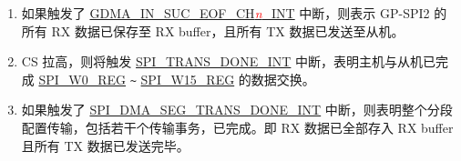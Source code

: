 \documentclass[main\_\_CN.tex]{subfiles}
\begin{document}
\begin{tiplisting}
\vspace{-2em}
\begin{enumerate}

\item 如果触发了 \hyperref[int:GDMAINSUCEOFINT]{GDMA\_IN\_SUC\_EOF\_CH\textcolor{red}{\it{n}}\_INT}  中断，则表示 GP-SPI2 的所有 RX 数据已保存至 RX buffer，且所有 TX 数据已发送至从机\label{other:spi-item-gp-spi2-master-interrupts-note-1}。

\item CS 拉高，则将触发 \hyperref[int:SPITRANSDONEINT]{SPI\_TRANS\_DONE\_INT} 中断，表明主机与从机已完成 \hyperref[regdesc:SPIW0REG]{SPI\_W0\_REG} \verb+~+ \hyperref[regdesc:SPIW15REG]{SPI\_W15\_REG} 的数据交换\label{other:spi-item-gp-spi2-master-interrupts-note-2}。

\item 如果触发了 \hyperref[int:SPIDMASEGTRANSDONEINT]{SPI\_DMA\_SEG\_TRANS\_DONE\_INT} 中断，则表明整个分段配置传输，包括若干个传输事务，已完成。即 RX 数据已全部存入 RX buffer 且所有 TX 数据已发送完毕。 \label{other:spi-item-gp-spi2-master-interrupts-note-3}
\end{enumerate}
\end{tiplisting}
\end{document}

